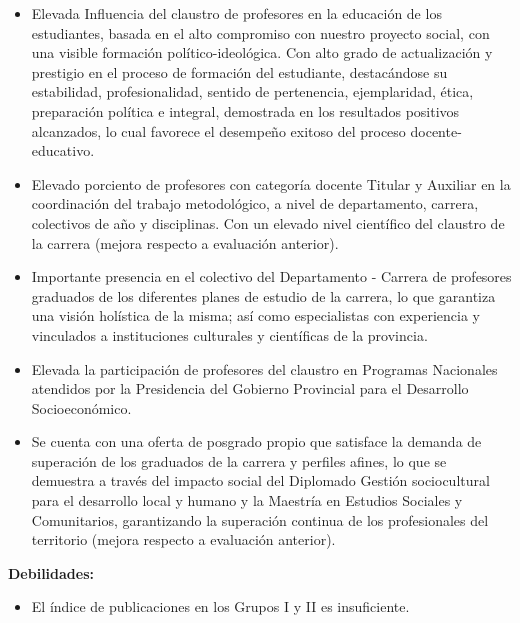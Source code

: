 \begin{itemize}
	\setlength\itemsep{-0.5em}
	\item Elevada Influencia del claustro de profesores en la educación de los estudiantes, basada en el alto compromiso con nuestro proyecto social, con una visible formación político-ideológica. Con alto grado de actualización y prestigio en el proceso de formación del estudiante, destacándose su estabilidad, profesionalidad, sentido de pertenencia, ejemplaridad, ética, preparación política e integral, demostrada en los resultados positivos alcanzados, lo cual favorece el desempeño exitoso del proceso docente-educativo. 
	\item Elevado porciento de profesores con categoría docente Titular y Auxiliar en la coordinación del trabajo metodológico, a nivel de departamento, carrera, colectivos de año y disciplinas. Con un elevado nivel científico del claustro de la carrera (mejora respecto a evaluación anterior).
	\item Importante presencia en el colectivo del Departamento - Carrera de profesores graduados de los diferentes planes de estudio de la carrera, lo que garantiza una visión holística de la misma; así como especialistas con experiencia y vinculados a instituciones culturales y científicas de la provincia.
	\item Elevada la participación de profesores del claustro en Programas Nacionales atendidos por la Presidencia del Gobierno Provincial para el Desarrollo Socioeconómico.
	\item Se cuenta con una oferta de posgrado propio que satisface la demanda de superación de los graduados de la carrera y perfiles afines, lo que se demuestra a través del impacto social del Diplomado Gestión sociocultural para el desarrollo local y humano y la Maestría en Estudios Sociales y Comunitarios, garantizando la superación continua de los profesionales del territorio (mejora respecto a evaluación anterior).
\end{itemize}

\textbf{Debilidades:}

\begin{itemize}
	\setlength\itemsep{-0.5em}
	\item El índice de publicaciones en los Grupos I y II es insuficiente.
\end{itemize}